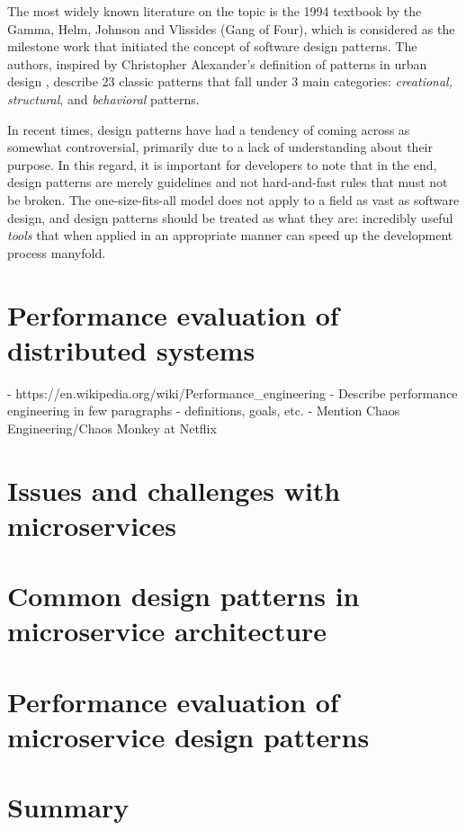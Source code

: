 The most widely known literature on the topic is the 1994 textbook \cite{gof94} by the Gamma, Helm, Johnson and Vlissides (Gang of Four), which is considered as the milestone work that initiated the concept of software design patterns. The authors, inspired by Christopher Alexander's definition of patterns in urban design \cite{alexander77}, describe 23 classic patterns that fall under 3 main categories: \textit{creational, structural}, and \textit{behavioral} patterns.


In recent times, design patterns have had a tendency of coming across as somewhat controversial, primarily due to a lack of understanding about their purpose. In this regard, it is important for developers to note that in the end, design patterns are merely guidelines and not hard-and-fast rules that must not be broken. The one-size-fits-all model does not apply to a field as vast as software design, and design patterns should be treated as what they are: incredibly useful \textit{tools} that
when applied in an appropriate manner can speed up the development process manyfold.

\section{Performance evaluation of distributed systems}

- https://en.wikipedia.org/wiki/Performance\_engineering
- Describe performance engineering in few paragraphs - definitions, goals, etc.
- Mention Chaos Engineering/Chaos Monkey at Netflix

\section{Issues and challenges with microservices}

\section{Common design patterns in microservice architecture}

\section{Performance evaluation of microservice design patterns}

\section{Summary}
